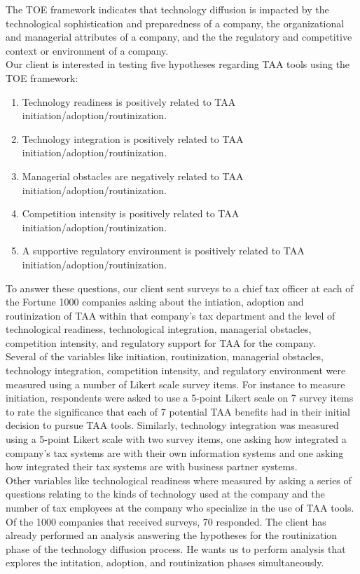 \documentclass[12pt, letterpaper]{article}
\begin{document}
The TOE framework indicates that technology diffusion is impacted by the technological sophistication and preparedness of a company, the organizational and managerial attributes of a company, and the the regulatory and competitive context or environment of a company. \\

Our client is interested in testing five hypotheses regarding TAA tools using the TOE framework:

\begin{enumerate}
\item Technology readiness is positively related to TAA initiation/adoption/routinization.
\item Technology integration is positively related to TAA initiation/adoption/routinization.
\item Managerial obstacles are negatively related to TAA initiation/adoption/routinization.
\item Competition intensity is positively related to TAA initiation/adoption/routinization.
\item A supportive regulatory environment is positively related to TAA initiation/adoption/routinization.
\end{enumerate}

To answer these questions, our client sent surveys to a chief tax officer at each of the Fortune 1000 companies asking about the intiation, adoption and routinization of TAA within that company's tax department and the level of technological readiness, technological integration, managerial obstacles, competition intensity, and regulatory support for TAA for the company.\\

Several of the variables like initiation, routinization, managerial obstacles, technology integration, competition intensity, and regulatory environment were measured using a number of Likert scale survey items. For instance to measure initiation, respondents were asked to use a 5-point Likert scale on 7 survey items to rate the significance that each of 7 potential TAA benefits had in their initial decision to pursue TAA tools. Similarly, technology integration was measured using a 5-point Likert scale with two survey items, one asking how integrated a company's tax systems are with their own information systems and one asking how integrated their tax systems are with business partner systems. \\

Other variables like technological readiness where measured by asking a series of questions relating to the kinds of technology used at the company and the number of tax employees at the company who specialize in the use of TAA tools. \\

Of the 1000 companies that received surveys, 70 responded. The client has already performed an analysis answering the hypotheses for the routinization phase of the technology diffusion process. He wants us to perform analysis that explores the intitation, adoption, and routinization phases simultaneously. 
\end{document}
